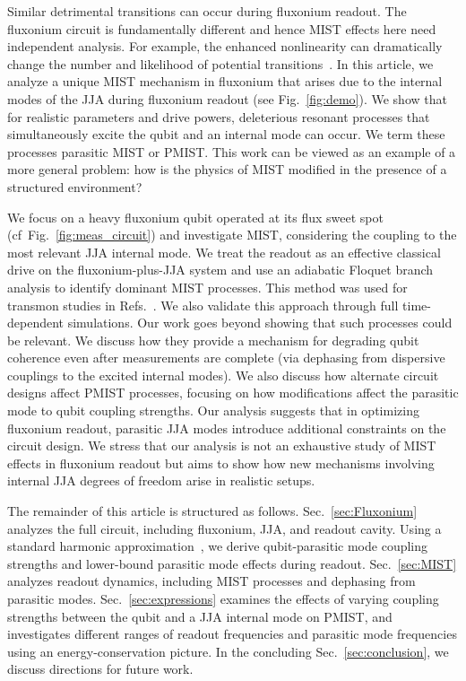 \documentclass[%
reprint,
superscriptaddress,
 amsmath,amssymb,
 aps,
 prx,
longbibliography,
floatfix,
]{revtex4-2}
\begin{document}
Similar detrimental transitions can occur during fluxonium readout. The fluxonium circuit is fundamentally different and hence MIST effects here need independent analysis. For example, the enhanced nonlinearity can dramatically change the number and likelihood of potential transitions~\cite{nesterov2024measurement,xiao2023diagrammatic}. In this article, we analyze a unique MIST mechanism in fluxonium that arises due to the internal modes of the JJA during fluxonium readout (see Fig.~\ref{fig:demo}). We show that for realistic parameters and drive powers, deleterious resonant processes that simultaneously excite the qubit and an internal mode can occur. We term these processes parasitic MIST or PMIST. This work can be viewed as an example of a more general problem: how is the physics of MIST modified in the presence of a structured environment?

We focus on a heavy fluxonium qubit operated at its flux sweet spot (cf~Fig.~\ref{fig:meas_circuit}) and investigate MIST, considering the coupling to the most relevant JJA internal mode. We treat the readout as an effective classical drive on the fluxonium-plus-JJA system and use an adiabatic Floquet branch analysis to identify dominant MIST processes. This method was used for transmon studies in Refs.~\cite{cohen2023reminiscence,dumas2024unified}. We also validate this approach through full time-dependent simulations.  
Our work goes beyond showing that such processes could be relevant. We discuss how they provide a mechanism for degrading qubit coherence even after measurements are complete (via dephasing from dispersive couplings to the excited internal modes). We also discuss how alternate circuit designs affect PMIST processes, focusing on how modifications affect the parasitic mode to qubit coupling strengths. Our analysis suggests that in optimizing fluxonium readout, parasitic JJA modes introduce additional constraints on the circuit design. We stress that our analysis is not an exhaustive study of MIST effects in fluxonium readout but aims to show how new mechanisms involving internal JJA degrees of freedom arise in realistic setups.

The remainder of this article is structured as follows. Sec.~\ref{sec:Fluxonium} analyzes the full circuit, including fluxonium, JJA, and readout cavity. Using a standard harmonic approximation~\cite{ferguson2013symmetries}, we derive qubit-parasitic mode coupling strengths and lower-bound parasitic mode effects during readout. Sec.~\ref{sec:MIST} analyzes readout dynamics, including MIST processes and dephasing from parasitic modes. Sec.~\ref{sec:expressions} examines the effects of varying coupling strengths between the qubit and a JJA internal mode on PMIST, and investigates different ranges of readout frequencies and parasitic mode frequencies using an energy-conservation picture. In the concluding Sec.~\ref{sec:conclusion}, we discuss directions for future work.
\end{document}
